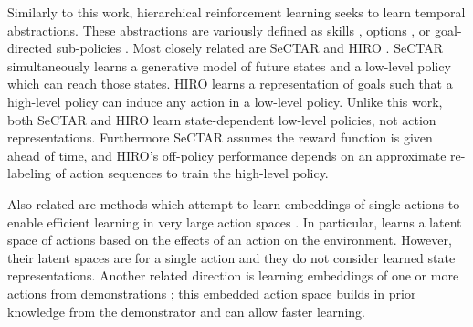 
Similarly to this work, hierarchical reinforcement learning seeks to learn temporal abstractions.
These abstractions are variously defined as skills \citep{florensa2017stochastic, hausman2018learning}, options \citep{sutton1999between, bacon2017option}, or goal-directed sub-policies \citep{kulkarni2016hierarchical, vezhnevets2017feudal}.
Most closely related are SeCTAR \citep{CoReyes2018SelfConsistentTA} and HIRO \citep{Nachum2018NearOptimalRL}.
SeCTAR simultaneously learns a generative model of future states and a low-level policy which can reach those states.
HIRO learns a representation of goals such that a high-level policy can induce any action in a low-level policy.
Unlike this work, both SeCTAR and HIRO learn state-dependent low-level policies, not action representations.
Furthermore SeCTAR assumes the reward function is given ahead of time, and HIRO's off-policy performance depends on an approximate re-labeling of action sequences to train the high-level policy.

Also related are methods which attempt to learn embeddings of single actions to enable efficient learning in very large action spaces \citep{dulac2015deep, chandak2019learning}.
In particular, \citet{chandak2019learning} learns a latent space of actions based on the effects of an action on the environment. However, their latent spaces are for a single action and they do not consider learned state representations.
Another related direction is learning embeddings of one or more actions from demonstrations \citep{tennenholtz2019natural}; this embedded action space builds in prior knowledge from the demonstrator and can allow faster learning.



